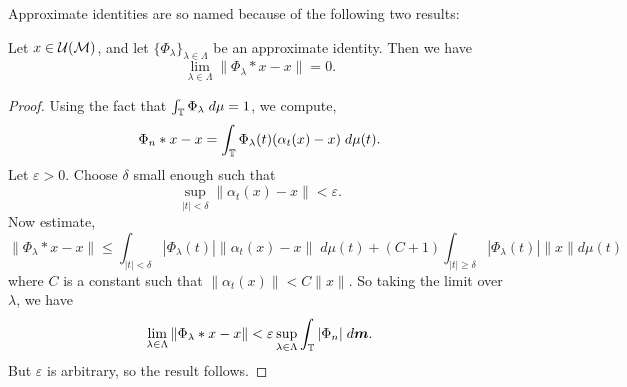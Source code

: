 Approximate identities are so named because of the following two results:
\begin{proposition}
    Let $x \in \mathcal{U}(\mathcal{M})$, and let $\{\Phi_\lambda\}_{\lambda \in \Lambda}$ be an 
    approximate identity. Then we have
    \begin{equation}
        \lim_{\lambda \in \Lambda} \|\Phi_\lambda*x - x\| = 0.
    \end{equation}
\end{proposition}
\begin{proof}
    Using the fact that $\int_{\mathbb{T}} \Phi_\lambda\;d\mu = 1$, we compute,
    \begin{equation}
        \Phi_n*x-x = \int_{\mathbb{T}} \Phi_\lambda(t)(\alpha_t(x)-x)\;d\mu(t).
    \end{equation}
    Let $\varepsilon > 0$. Choose $\delta$ small enough such that
    \begin{equation}
        \sup_{|t| < \delta} \|\alpha_t(x)-x\| < \varepsilon.
    \end{equation}
    Now estimate,
    \begin{equation}
        \|\Phi_\lambda*x - x\| \leq \int_{|t| < \delta} |\Phi_\lambda(t)|\|\alpha_t(x)-x\|\;d\mu(t) + (C+1)\int_{|t| \geq \delta} |\Phi_\lambda(t)|\|x\| d\mu(t)
    \end{equation}
    where $C$ is a constant such that $\|\alpha_t(x)\| < C\|x\|$.
    So taking the limit over $\lambda$, we have
    \begin{equation}
        \lim_{\lambda \in \Lambda} \|\Phi_\lambda*x-x\| < \varepsilon \sup_{\lambda \in \Lambda} \int_{\mathbb{T}} |\Phi_n|\;d\boldsymbol{m}.
    \end{equation}
    But $\varepsilon$ is arbitrary, so the result follows.
\end{proof}


